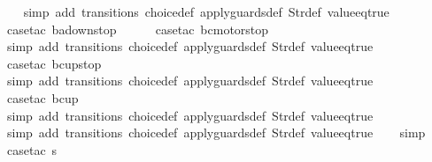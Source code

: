 \begin{isabellebody}
\ \ \isamarkupfalse%
\ {\isacharparenleft}simp\ add{\isacharcolon}\ transitions\ choice{\isacharunderscore}def\ apply{\isacharunderscore}guards{\isacharunderscore}def\ Str{\isacharunderscore}def\ value{\isacharunderscore}eq{\isacharunderscore}true{\isacharparenright}\isanewline
\ \ \ \isamarkupfalse%
\ {\isacharparenleft}case{\isacharunderscore}tac\ {\isachardoublequoteopen}ba{\isacharequal}down{}{}stop{\isachardoublequoteclose}{\isacharparenright}\isanewline
\ \ \ \ \isamarkupfalse%
\ {\isacharparenleft}case{\isacharunderscore}tac\ {\isachardoublequoteopen}bc{\isacharequal}motorstop{}{\isachardoublequoteclose}{\isacharparenright}\isanewline
\ \ \ \ \ \isamarkupfalse%
\ {\isacharparenleft}simp\ add{\isacharcolon}\ transitions\ choice{\isacharunderscore}def\ apply{\isacharunderscore}guards{\isacharunderscore}def\ Str{\isacharunderscore}def\ value{\isacharunderscore}eq{\isacharunderscore}true{\isacharparenright}\isanewline
\ \ \ \ \isamarkupfalse%
\ {\isacharparenleft}case{\isacharunderscore}tac\ {\isachardoublequoteopen}bc{\isacharequal}up{}{}stop{\isachardoublequoteclose}{\isacharparenright}\isanewline
\ \ \ \ \ \isamarkupfalse%
\ {\isacharparenleft}simp\ add{\isacharcolon}\ transitions\ choice{\isacharunderscore}def\ apply{\isacharunderscore}guards{\isacharunderscore}def\ Str{\isacharunderscore}def\ value{\isacharunderscore}eq{\isacharunderscore}true{\isacharparenright}\isanewline
\ \ \ \ \isamarkupfalse%
\ {\isacharparenleft}case{\isacharunderscore}tac\ {\isachardoublequoteopen}bc{\isacharequal}up{}{}{\isachardoublequoteclose}{\isacharparenright}\isanewline
\ \ \ \ \ \isamarkupfalse%
\ {\isacharparenleft}simp\ add{\isacharcolon}\ transitions\ choice{\isacharunderscore}def\ apply{\isacharunderscore}guards{\isacharunderscore}def\ Str{\isacharunderscore}def\ value{\isacharunderscore}eq{\isacharunderscore}true{\isacharparenright}\isanewline
\ \ \ \ \isamarkupfalse%
\ {\isacharparenleft}simp\ add{\isacharcolon}\ transitions\ choice{\isacharunderscore}def\ apply{\isacharunderscore}guards{\isacharunderscore}def\ Str{\isacharunderscore}def\ value{\isacharunderscore}eq{\isacharunderscore}true{\isacharparenright}\isanewline
\ \ \isamarkupfalse%
\ simp\isanewline
\ \ \isamarkupfalse%
\ {\isacharparenleft}case{\isacharunderscore}tac\ {\isachardoublequoteopen}s{\isacharequal}{}{\isachardoublequoteclose}{\isacharparenright}\isanewline

\end{isabellebody}
